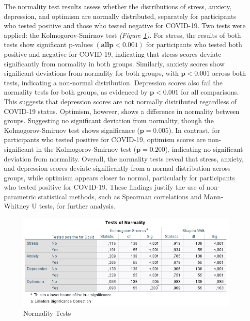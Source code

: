 \documentclass[a4paper]{article}
\begin{document}
\vspace{3em}\noindent

The normality test results assess whether the distributions of stress, anxiety, depression, and optimism are normally distributed,
separately for participants who tested positive and those who tested negative for COVID-19.
Two tests were applied: the Kolmogorov-Smirnov test \textit{(Figure \ref{fig:normalityTest})}.
\vspace{0.5em}\newline
For stress, the results of both tests show significant p-values \(\boldsymbol{(all p<0.001)}\) for participants who tested both positive and negative for COVID-19, indicating that stress scores deviate significantly from normality in both groups.\newline
Similarly, anxiety scores show significant deviations from normality for both groups, with \(\boldsymbol{p<0.001}\) across both tests, indicating a non-normal distribution.\newline
Depression scores also fail the normality tests for both groups, as evidenced by \(\boldsymbol{p<0.001}\) for all comparisons.\newline
This suggests that depression scores are not normally distributed regardless of COVID-19 status.
Optimism, however, shows a difference in normality between groups. Suggesting no significant deviation from normality, though the Kolmogorov-Smirnov test shows significance (\(\boldsymbol{p=0.005}\)).
\vspace{0.5em}\newline
In contrast, for participants who tested positive for COVID-19, optimism scores are non-significant in the Kolmogorov-Smirnov test (\(\boldsymbol{p=0.200}\)), indicating no significant deviation from normality.
Overall, the normality tests reveal that stress, anxiety, and depression scores deviate significantly from a normal distribution across groups,
while optimism appears closer to normal, particularly for participants who tested positive for COVID-19. These findings justify the use of non-parametric statistical methods, such as Spearman correlations and Mann-Whitney U tests, for further analysis.
\vspace{1.5em}

\begin{figure}[ht]
  \centering
  \caption{Normality Tests}
  \label{fig:normalityTest}
  \includegraphics[width=\textwidth]{img/normality_test.png}  %
\end{figure}
\end{document}
